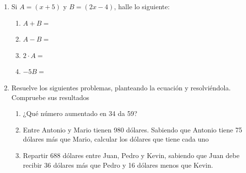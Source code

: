 \documentclass[fleqn]{article}
\begin{document}
\begin{enumerate}
{\begin{center}
  \end{center}
}%
\noanswer
\newpage
  \item Si $A=(x+5)$ y $B=(2x-4)$, halle lo siguiente:
  \begin{enumerate}
   \item $A+B=$\noanswer[25pt]
   \item $A-B=$\noanswer[25pt]
   \item $2\cdot A=$\noanswer[25pt]
   \item $-5B=$\noanswer[25pt]
  \end{enumerate}
  \item Resuelve los siguientes problemas, planteando la ecuación y resolviéndola. Compruebe sus resultados
  \begin{enumerate}
   \item ¿Qué número aumentado en 34 da 59?\noanswer
   \item Entre Antonio y Mario tienen 980 dólares. Sabiendo que Antonio tiene 75 dólares más que Mario, calcular los dólares que tiene cada uno\noanswer
   \item Repartir 688 dólares entre Juan, Pedro y Kevin, sabiendo que Juan debe recibir 36 dólares más que Pedro y 16 dólares menos que Kevin.
  \end{enumerate}
\end{enumerate}
\end{document}
